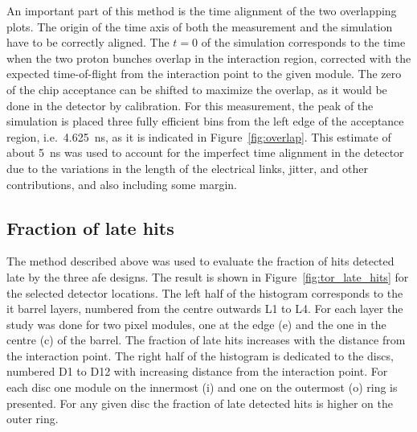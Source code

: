An important part of this method is the time alignment of the two overlapping plots. The origin of the time axis of both the measurement and the simulation have to be correctly aligned.
The $t=0$ of the simulation corresponds to the time when the two proton bunches overlap in the interaction region, corrected with the expected time-of-flight from the interaction point to the given module. The zero of the chip acceptance can be shifted to maximize the overlap, as it would be done in the detector by calibration. For this measurement, the peak of the simulation is placed three fully efficient bins from the left edge of the acceptance region, i.e.~\SI{4.625}{\nano\second}, as it is indicated in Figure~\ref{fig:overlap}. This estimate of about \SI{5}{\nano\second} was used to account for the imperfect time alignment in the detector due to the variations in the length of the electrical links, jitter, and other contributions, and also including some margin.




\subsection*{Fraction of late hits}

The method described above was used to evaluate the fraction of hits detected late by the three \gls{afe} designs. The result is shown in Figure~\ref{fig:tor_late_hits} for the selected detector locations.
The left half of the histogram corresponds to the \gls{it} barrel layers, numbered from the centre outwards L1 to L4. For each layer the study was done for two pixel modules, one at the edge (e) and the one in the centre (c) of the barrel. The fraction of late hits increases with the distance from the interaction point. 
The right half of the histogram is dedicated to the discs, numbered D1 to D12 with increasing distance from the interaction point. For each disc one module on the innermost (i) and one on the outermost (o) ring is presented. For any given disc the fraction of late detected hits is higher on the outer ring.

